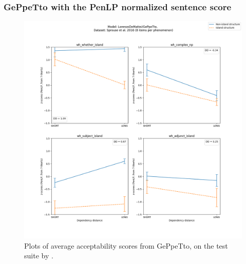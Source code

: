 \subsubsection{GePpeTto with the PenLP normalized sentence score}
\begin{figure}[h]
	\centering
	\includegraphics[width=1\textwidth]{images/Chapter1/Sprouse_wh_LorenzoDeMattei_GePpeTto_PenLP-zscores-likert-2022-09-14_h17m23s36.png} 
	\caption{Plots of average acceptability scores from GePpeTto, on the test suite by \citet{sprouse2016experimental}.}
	\label{fig:sprouse_gpt_penlp} 
	\medskip
\end{figure}	







